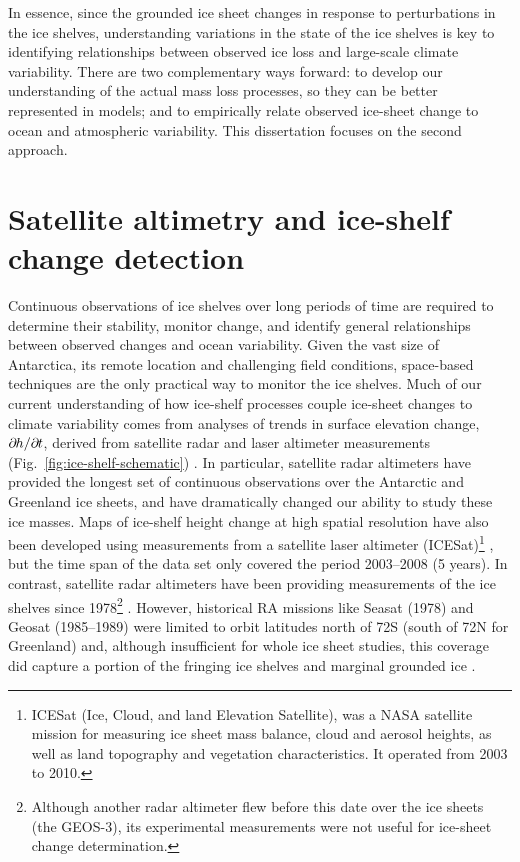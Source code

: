 In essence, since the grounded ice sheet changes in response to perturbations in the ice
shelves, understanding variations in the state of the ice shelves is key to
identifying relationships between observed ice loss and large-scale climate variability.
There are two complementary ways forward: to develop our understanding of the actual mass
loss processes, so they can be better represented in models; and to empirically relate observed
ice-sheet change to ocean and atmospheric variability. This dissertation focuses on the second
approach.

\section{Satellite altimetry and ice-shelf change detection}

\noindent
Continuous observations of ice shelves over long periods of time are required to determine their stability,
monitor change, and identify general relationships between observed changes and ocean
variability. Given the vast size of Antarctica, its remote location and challenging field conditions,
space-based techniques are the only practical way to monitor the ice shelves.
Much of our current understanding of how ice-shelf processes couple ice-sheet changes to climate variability comes from analyses of trends in surface elevation change, $\partial\mkern-1.5mu h / \partial\mkern-1.5mu t$, derived from satellite radar and laser altimeter measurements (Fig.~\ref{fig:ice-shelf-schematic}) \parencite{Zwally2005, Shepherd2010, Pritchard2012, Fricker2012}.
In particular, satellite radar altimeters
have provided the longest set of continuous observations over the Antarctic and Greenland ice sheets, and have dramatically changed our ability to study these ice masses. Maps of ice-shelf height change at high spatial resolution have also been developed using measurements from a satellite laser altimeter (ICESat)\footnote{ICESat (Ice, Cloud, and land Elevation Satellite), was a NASA satellite mission for measuring ice sheet mass balance, cloud and aerosol heights, as well as land topography and vegetation characteristics. It operated from 2003 to 2010.} \parencite{Pritchard2012}, but the time span of the data set only covered the period 2003--2008 (5 years). In contrast, satellite radar altimeters have been providing
measurements of the ice shelves since 1978\footnote{Although another radar altimeter flew before
this date over the ice sheets (the GEOS-3), its experimental measurements were not
useful for ice-sheet change determination.} \parencite{Zwally1983, Zwally1989, Davis1998, Martin1983}. However,
historical RA missions like Seasat (1978) and Geosat (1985--1989) were limited to orbit latitudes north of 72\degree S (south of 72\degree N for Greenland) and, although insufficient for whole ice sheet studies, this coverage did capture a portion of the fringing ice shelves and marginal grounded ice \parencite[e.g.,][]{Fricker2012}.

